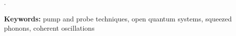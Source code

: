 \begin{resumen}

\noindent \lipsum[1-3].
\vspace*{2em}

\noindent \textbf{Keywords:} {pump and probe techniques, open quantum systems, squeezed phonons, coherent oscillations}
\end{resumen}






